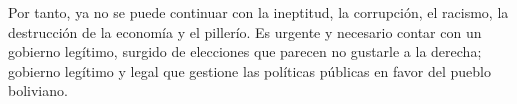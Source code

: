\documentclass[a4paper, nobind]{templates/ociamthesis}
\newcommand*{\bibtitle}{Works Cited}
\begin{document}
Por tanto, ya no se puede continuar con la ineptitud, la corrupción, el racismo, la destrucción de la economía y el pillerío. Es urgente y necesario contar con un gobierno legítimo, surgido de elecciones que parecen no gustarle a la derecha; gobierno legítimo y legal que gestione las políticas públicas en favor del pueblo boliviano.




\setlength{\baselineskip}{0pt} %

{\renewcommand*\MakeUppercase[1]{#1}%
\printbibliography[heading=bibintoc,title={\bibtitle}]}
\end{document}
